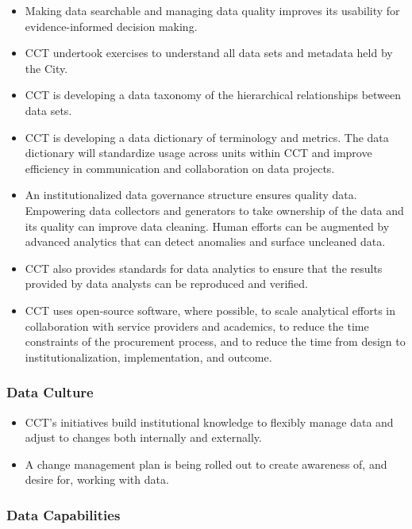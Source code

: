 \documentclass[
]{book}
\providecommand{\tightlist}{%
  \setlength{\itemsep}{0pt}\setlength{\parskip}{0pt}}
\begin{document}
\begin{itemize}
\tightlist
\item
  Making data searchable and managing data quality improves its usability for evidence-informed decision making.
\item
  CCT undertook exercises to understand all data sets and metadata held by the City.
\item
  CCT is developing a data taxonomy of the hierarchical relationships between data sets.
\item
  CCT is developing a data dictionary of terminology and metrics. The data dictionary will standardize usage across units within CCT and improve efficiency in communication and collaboration on data projects.
\item
  An institutionalized data governance structure ensures quality data. Empowering data collectors and generators to take ownership of the data and its quality can improve data cleaning. Human efforts can be augmented by advanced analytics that can detect anomalies and surface uncleaned data.
\item
  CCT also provides standards for data analytics to ensure that the results provided by data analysts can be reproduced and verified.
\item
  CCT uses open-source software, where possible, to scale analytical efforts in collaboration with service providers and academics, to reduce the time constraints of the procurement process, and to reduce the time from design to institutionalization, implementation, and outcome.
\end{itemize}

\hypertarget{data-culture}{%
\subsubsection*{Data Culture}\label{data-culture}}

\begin{itemize}
\tightlist
\item
  CCT's initiatives build institutional knowledge to flexibly manage data and adjust to changes both internally and externally.
\item
  A change management plan is being rolled out to create awareness of, and desire for, working with data.
\end{itemize}

\hypertarget{data-capabilities}{%
\subsubsection*{Data Capabilities}\label{data-capabilities}}
\end{document}

